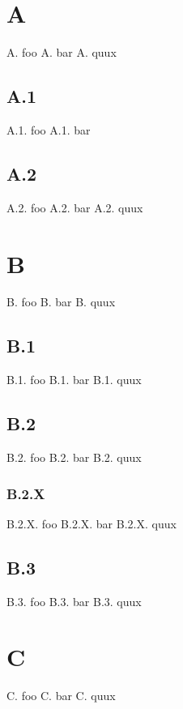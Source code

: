 \documentclass[11pt]{article}
\begin{document}
    \section{A}
    A. foo
    A. bar
    A. quux

    \subsection{A.1}
    A.1. foo
    A.1. bar

    \subsection{A.2}
    A.2. foo
    A.2. bar
    A.2. quux

    \section{B}
    B. foo
    B. bar
    B. quux

    \subsection{B.1}
    B.1. foo
    B.1. bar
    B.1. quux

    \subsection{B.2}
    B.2. foo
    B.2. bar
    B.2. quux

    \subsubsection{B.2.X}
    B.2.X. foo
    B.2.X. bar
    B.2.X. quux

    \subsection{B.3}
    B.3. foo
    B.3. bar
    B.3. quux

    \section{C}
    C. foo
    C. bar
    C. quux
\end{document}
